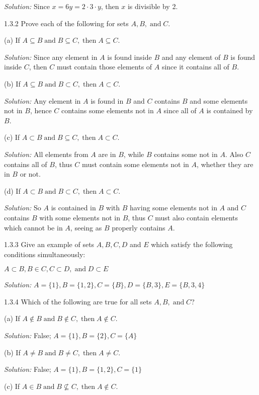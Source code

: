 \documentclass{letter}
\newcommand{\nin}{\not\in}
\newcommand{\tmop}[1]{\ensuremath{\operatorname{#1}}}
\newcommand{\tmtextit}[1]{{\itshape{#1}}}
\begin{document}
\tmtextit{Solution:} Since $x = 6 y = 2 \cdot 3 \cdot y$, then $x$ is
divisible by 2.

1.3.2 Prove each of the following for sets $A, B, \tmop{and} C .$

(a) If $A \subseteq B \tmop{and} B \subseteq C, \tmop{then} A \subseteq C$.

\tmtextit{Solution:} Since any element in $A$ is found inside $B$ and any
element of $B$ is found inside $C$, then $C$ must contain those elements of
$A$ since it contains all of $B$.

(b) If $A \subseteq B \tmop{and} B \subset C, \tmop{then} A \subset C$.

\tmtextit{Solution:} Any element in $A$ is found in $B$ and $C$ contains $B$
and some elements not in $B$, hence $C$ contains some elements not in $A$
since all of $A$ is contained by $B$.

(c) If $A \subset B \tmop{and} B \subseteq C, \tmop{then} A \subset C$.

\tmtextit{Solution:} All elements from $A$ are in $B$, while $B$ contains some
not in $A$. Also $C$ contains all of $B$, thus $C$ must contain some elements
not in $A$, whether they are in $B$ or not.

(d) If $A \subset B \tmop{and} B \subset C, \tmop{then} A \subset C$.

\tmtextit{Solution:} So $A$ is contained in $B$ with $B$ having some elements
not in $A$ and $C$ contains $B$ with some elements not in $B$, thus $C$ must
also contain elements which cannot be in $A$, seeing as $B$ properly contains
$A$.

1.3.3 Give an example of sets $A, B, C, D$ and $E$ which satisfy the following
conditions simultaneously:

$A \subset B, B \in C, C \subset D, \tmop{and} D \subset E$

\tmtextit{Solution:} $A =\{1\}, B =\{1, 2\}, C =\{B\}, D =\{B, 3\}, E =\{B, 3,
4\}$

1.3.4 Which of the following are true for all sets $A, B, \tmop{and} C$?

(a) If $A \nin B \tmop{and} B \nin C, \tmop{then} A \nin C$.

\tmtextit{Solution:} False; $A =\{1\}, B =\{2\}, C =\{A\}$

(b) If $A \neq B \tmop{and} B \neq C, \tmop{then} A \neq C$.

\tmtextit{Solution:} False; $A =\{1\}, B =\{1, 2\}, C =\{1\}$

(c) If $A \in B \tmop{and} B \nsubseteq C, \tmop{then} A \nin C$.
\end{document}
